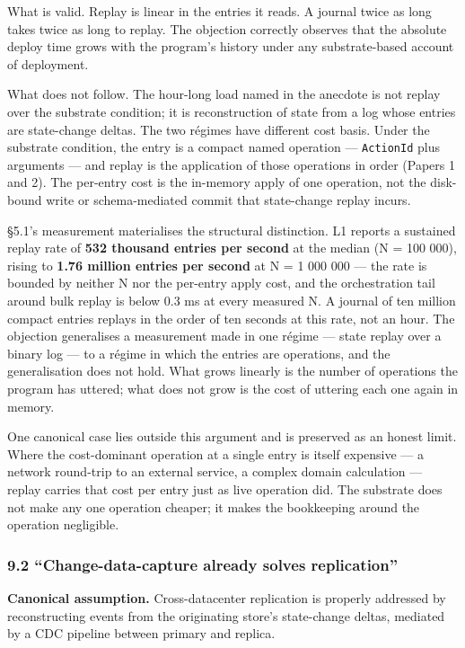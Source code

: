 \documentclass[
]{article}
\begin{document}
What is valid. Replay is linear in the entries it reads. A journal twice
as long takes twice as long to replay. The objection correctly observes
that the absolute deploy time grows with the program's history under any
substrate-based account of deployment.

What does not follow. The hour-long load named in the anecdote is not
replay over the substrate condition; it is reconstruction of state from
a log whose entries are state-change deltas. The two régimes have
different cost basis. Under the substrate condition, the entry is a
compact named operation --- \texttt{ActionId} plus arguments --- and
replay is the application of those operations in order (Papers 1 and 2).
The per-entry cost is the in-memory apply of one operation, not the
disk-bound write or schema-mediated commit that state-change replay
incurs.

§5.1's measurement materialises the structural distinction. L1 reports a
sustained replay rate of \textbf{532 thousand entries per second} at the
median (N = 100 000), rising to \textbf{1.76 million entries per second}
at N = 1 000 000 --- the rate is bounded by neither N nor the per-entry
apply cost, and the orchestration tail around bulk replay is below 0.3
ms at every measured N. A journal of ten million compact entries replays
in the order of ten seconds at this rate, not an hour. The objection
generalises a measurement made in one régime --- state replay over a
binary log --- to a régime in which the entries are operations, and the
generalisation does not hold. What grows linearly is the number of
operations the program has uttered; what does not grow is the cost of
uttering each one again in memory.

One canonical case lies outside this argument and is preserved as an
honest limit. Where the cost-dominant operation at a single entry is
itself expensive --- a network round-trip to an external service, a
complex domain calculation --- replay carries that cost per entry just
as live operation did. The substrate does not make any one operation
cheaper; it makes the bookkeeping around the operation negligible.

\subsubsection{9.2 ``Change-data-capture already solves
replication''}\label{change-data-capture-already-solves-replication}

\textbf{Canonical assumption.} Cross-datacenter replication is properly
addressed by reconstructing events from the originating store's
state-change deltas, mediated by a CDC pipeline between primary and
replica.
\end{document}
